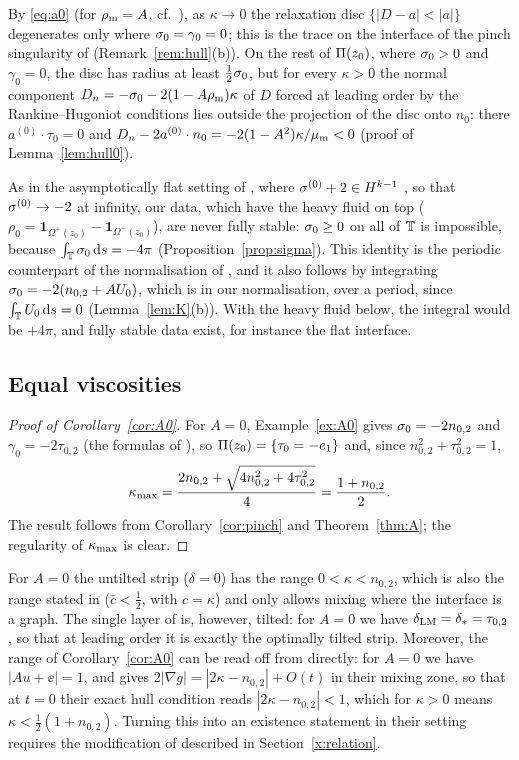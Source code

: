 By \eqref{eq:a0} (for $\rho_{\mathrm m}=A$, cf.\ \cite[(7.11), Prop.~7.4 and (3.7b)]{LM26}), as $\kappa\to0$ the relaxation disc $\{|D-a|<|a|\}$ degenerates only where $\sigma_0=\gamma_0=0$; this is the trace on the
interface of the pinch singularity of \cite{Men22} (Remark~\ref{rem:hull}(b)). On the rest of $\Pi(z_0)$, where $\sigma_0>0$ and $\gamma_0=0$, the disc has radius at least $\frac12\sigma_0$, but for
every $\kappa>0$ the normal component $D_n=-\sigma_0-2(1-A\rho_{\mathrm m})\kappa$ of $D$ forced at leading order by the Rankine--Hugoniot conditions lies outside the projection of the disc onto $n_0$: there
$a^{(0)}\cdot\tau_0=0$ and $D_n-2a^{(0)}\cdot n_0=-2(1-A^2)\kappa/\mu_{\mathrm m}<0$ (proof of Lemma~\ref{lem:hull0}).

As in the asymptotically flat setting of \cite{LM26}, where $\sigma^{(0)}+2\in H^{k-1}$ \cite[Prop.~6.3]{LM26}, so that $\sigma^{(0)}\to-2$ at infinity, our data, which have the heavy fluid on top
($\rho_0=\mathbf 1_{\Omega^+(z_0)}-\mathbf 1_{\Omega^-(z_0)}$), are never fully stable: $\sigma_0\ge0$ on all of $\mathbb{T}$ is impossible, because $\int_{\mathbb{T}}\sigma_0\,\mathrm{d} s=-4\pi$ (Proposition~\ref{prop:sigma}). This
identity is the periodic counterpart of the normalisation of \cite[Prop.~6.3]{LM26}, and it also follows by integrating $\sigma_0=-2(n_{0,2}+AU_0)$, which is \cite[(3.8)]{LM26} in our normalisation, over
a period, since $\int_{\mathbb{T}} U_0\,\mathrm{d} s=0$ (Lemma~\ref{lem:K}(b)). With the heavy fluid below, the integral would be $+4\pi$, and fully stable data exist, for instance the flat interface.

\subsection{Equal viscosities}
\begin{proof}[Proof of Corollary~\ref{cor:A0}]
For $A=0$, Example~\ref{ex:A0} gives $\sigma_0=-2n_{0,2}$ and $\gamma_0=-2\tau_{0,2}$ (the formulas of \cite[Secs.~1.2 and~3.1.3]{LM26}), so $\Pi(z_0)=\{\tau_0=-e_1\}$ and, since
$n_{0,2}^2+\tau_{0,2}^2=1$,
\[
\kappa_{\max}=\frac{2n_{0,2}+\sqrt{4n_{0,2}^2+4\tau_{0,2}^2}}{4}=\frac{1+n_{0,2}}{2}.
\]
The result follows from Corollary~\ref{cor:pinch} and Theorem~\ref{thm:A}; the regularity of $\kappa_{\max}$ is clear.
\end{proof}

For $A=0$ the untilted strip ($\delta=0$) has the range $0<\kappa<n_{0,2}$, which is also the range stated in \cite{LM26} ($\bar c<\frac12$, with $c=\kappa$) and only allows mixing where the
interface is a graph. The single layer of \cite{LM26} is, however, tilted: for $A=0$ we have $\delta_{\rm LM}=\delta_*=\tau_{0,2}$, so that at leading order it is exactly the optimally tilted strip.
Moreover, the range of Corollary~\ref{cor:A0} can be read off from \cite{LM26} directly: for $A=0$ we have $|Au+\ee|=1$, and \cite[(7.9)]{LM26} gives $2|\nabla g|=|2\kappa-n_{0,2}|+O(t)$ in their
mixing zone, so that at $t=0$ their exact hull condition \cite[(4.14)]{LM26} reads $|2\kappa-n_{0,2}|<1$, which for $\kappa>0$ means $\kappa<\frac12(1+n_{0,2})$. Turning this into an existence
statement in their setting requires the modification of \cite[Sec.~7.4]{LM26} described in Section~\ref{x:relation}.

